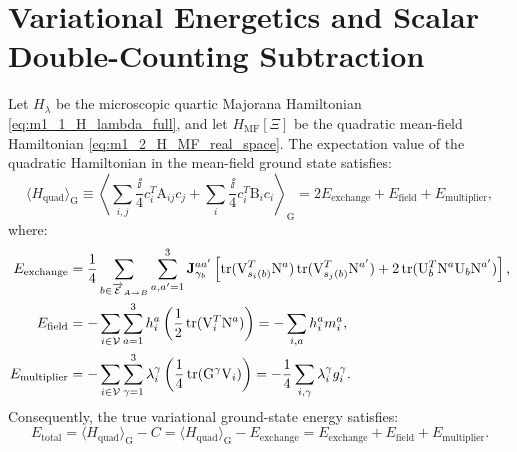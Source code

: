 \section{Variational Energetics and Scalar Double-Counting Subtraction}
\label{sec:m1_4_energetics_theorem}

\begin{theorem}
\label{thm:m1_4_double_counting}
Let $H_\lambda$ be the microscopic quartic Majorana Hamiltonian \eqref{eq:m1_1_H_lambda_full}, and let $H_{\mathrm{MF}}[\Xi]$ be the quadratic mean-field Hamiltonian \eqref{eq:m1_2_H_MF_real_space}. The expectation value of the quadratic Hamiltonian in the mean-field ground state satisfies:
\begin{equation}
\label{eq:m1_4_quad_expectation_decomposition}
\langle H_{\mathrm{quad}} \rangle_{\mathrm{G}} \equiv \left\langle \sum_{i,j} \frac{\ii}{4} c_i^T \mathrm{A}_{ij} c_j + \sum_i \frac{\ii}{4} c_i^T \mathrm{B}_i c_i \right\rangle_{\mathrm{G}} = 2 E_{\mathrm{exchange}} + E_{\mathrm{field}} + E_{\mathrm{multiplier}},
\end{equation}
where:
\begin{align}
\label{eq:m1_4_E_exchange}
E_{\mathrm{exchange}} &= \frac{1}{4} \sum_{b \in \overrightarrow{\mathcal{E}}_{A \to B}} \sum_{a,a'=1}^3 \mathbf{J}_{\gamma_b}^{aa'} \left[ \operatorname{tr}(\mathrm{V}_{s_i(b)}^T \mathrm{N}^a) \operatorname{tr}(\mathrm{V}_{s_j(b)}^T \mathrm{N}^{a'}) + 2 \operatorname{tr}(\mathrm{U}_b^T \mathrm{N}^a \mathrm{U}_b \mathrm{N}^{a'}) \right], \\
\label{eq:m1_4_E_field}
E_{\mathrm{field}} &= -\sum_{i \in \mathcal{V}} \sum_{a=1}^3 h_i^a \left( \frac{1}{2} \operatorname{tr}(\mathrm{V}_i^T \mathrm{N}^a) \right) = -\sum_{i, a} h_i^a m_i^a, \\
\label{eq:m1_4_E_multiplier}
E_{\mathrm{multiplier}} &= -\sum_{i \in \mathcal{V}} \sum_{\gamma=1}^3 \lambda_i^\gamma \left( \frac{1}{4} \operatorname{tr}(\mathrm{G}^\gamma \mathrm{V}_i) \right) = -\frac{1}{4} \sum_{i, \gamma} \lambda_i^\gamma g_i^\gamma.
\end{align}
Consequently, the true variational ground-state energy satisfies:
\begin{equation}
\label{eq:m1_4_E_total_subtracted}
E_{\mathrm{total}} = \langle H_{\mathrm{quad}} \rangle_{\mathrm{G}} - C = \langle H_{\mathrm{quad}} \rangle_{\mathrm{G}} - E_{\mathrm{exchange}} = E_{\mathrm{exchange}} + E_{\mathrm{field}} + E_{\mathrm{multiplier}}.
\end{equation}
\end{theorem}
